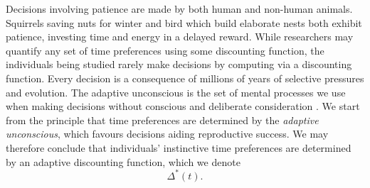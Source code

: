 \documentclass[titlepage, hidelinks, 12pt]{article}
\theoremstyle{plain}
\theoremstyle{remark}
\theoremstyle{definition}
\DeclareMathOperator{\hyp}{hyp}
\begin{document}
%        

Decisions involving patience are made by both human and non-human animals. Squirrels saving nuts for winter and bird which build elaborate nests
both exhibit patience, investing time and energy in a delayed reward. While researchers may quantify any set of time preferences using
some discounting function, the individuals being studied rarely make decisions by computing via a discounting function. 
Every decision is a consequence of millions of years of selective pressures and evolution. The adaptive unconscious is 
the set of mental processes we use when making decisions without conscious and deliberate consideration \cite{wegner02}. We start from the principle
that time preferences are determined by the \textit{adaptive unconscious},
which favours decisions aiding reproductive success. 
We may therefore conclude that individuals' instinctive time preferences are determined by an adaptive discounting function, which we denote
\begin{equation}
    \Delta^*(t).
    \label{eqn:adaptive_discounting}
\end{equation}
\end{document}
